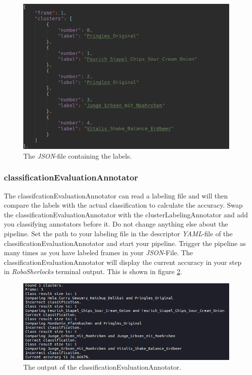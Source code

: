 \documentclass[main.tex]{subfiles}
\begin{document}
\begin{figure}
  \includegraphics[width=\linewidth]{pictures/perception/labeling_file.png}
  \caption{The \textit{JSON}-file containing the labels.}
  \label{fig:labeling file}
\end{figure}


\subsubsection{classificationEvaluationAnnotator}\label{classificationEvaluationAnnotator}
The classifcationEvaluationAnnotator can read a labeling file and will then compare the labels with the actual classification to calculate the accuracy. Swap the classificationEvaluationAnnotator with the clusterLabelingAnnotator and add you classifying annotators before it. Do not change anything else about the pipeline. Set the path to your labeling file in the descriptor \textit{YAML}-file of the classificationEvaluationAnnotator and start your pipeline. Trigger the pipeline as many times as you have labeled frames in your \textit{JSON}-File. The classificationEvaluationAnnotator will display the current accuracy in your step in \textit{RoboSherlocks} terminal output. This is shown in figure \ref{fig:classificationEvaluationAnnotator output}.

\begin{figure}
  \includegraphics[width=\linewidth]{pictures/perception/accuracy.png}
  \caption{The output of the classificationEvaluationAnnotator.}
  \label{fig:classificationEvaluationAnnotator output}
\end{figure}
\end{document}
